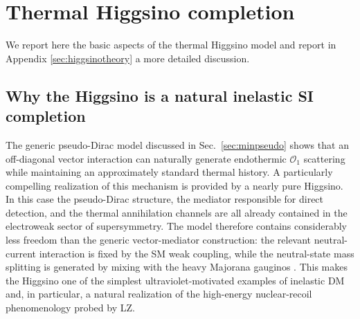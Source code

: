 \documentclass[aps,prd,reprint,superscriptaddress,nofootinbib,longbibliography,floatfix]{revtex4-2}
\begin{document}
\section{Thermal Higgsino completion}


We report here the basic aspects of the thermal Higgsino model and report in Appendix \ref{sec:higgsinotheory} a more detailed discussion.


\subsection{Why the Higgsino is a natural inelastic SI completion}

The generic pseudo-Dirac model discussed in Sec.~\ref{sec:minpseudo} shows that an off-diagonal vector interaction can naturally generate endothermic $\mathcal{O}_1$ scattering while maintaining an approximately standard thermal history. A particularly compelling realization of this mechanism is provided by a nearly pure Higgsino. In this case the pseudo-Dirac structure, the mediator responsible for direct detection, and the thermal annihilation channels are all already contained in the electroweak sector of supersymmetry. The model therefore contains considerably less freedom than the generic vector-mediator construction: the relevant neutral-current interaction is fixed by the SM weak coupling, while the neutral-state mass splitting is generated by mixing with the heavy Majorana gauginos \cite{NagataShirai2015,KrallReece2018,Graham2025}. This makes the Higgsino one of the simplest ultraviolet-motivated examples of inelastic DM and, in particular, a natural realization of the high-energy nuclear-recoil phenomenology probed by LZ.
\end{document}
